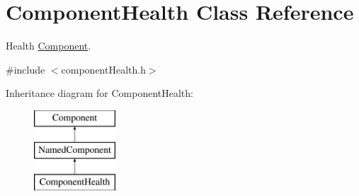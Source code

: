 \hypertarget{classComponentHealth}{
\section{\-Component\-Health \-Class \-Reference}
\label{dc/d15/classComponentHealth}
}


\-Health \hyperlink{classComponent}{\-Component}.  




{\ttfamily \#include $<$component\-Health.\-h$>$}

\-Inheritance diagram for \-Component\-Health\-:\begin{figure}[H]
\begin{center}
\leavevmode
\includegraphics[height=3.000000cm]{dc/d15/classComponentHealth}
\end{center}
\end{figure}
